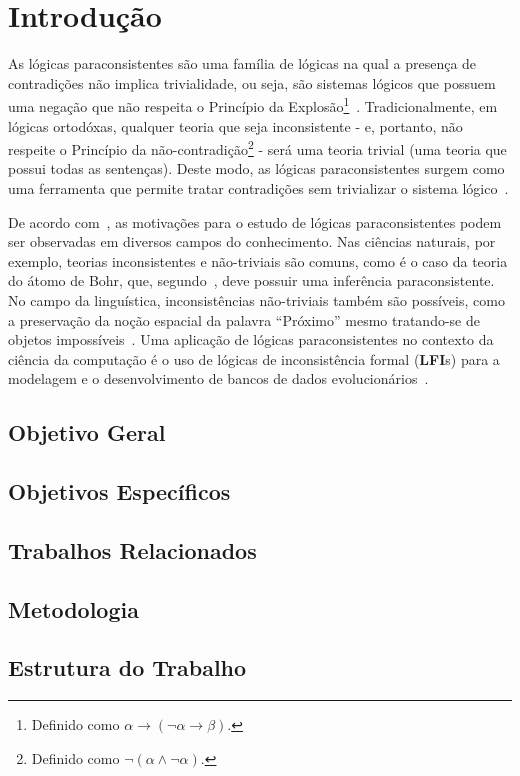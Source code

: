 \chapter{Introdução} 
\label{cap:Introducao}
As lógicas paraconsistentes são uma família de lógicas na qual a presença de contradições não implica trivialidade, ou seja, são sistemas lógicos que possuem uma negação que não respeita o Princípio da Explosão\footnote{Definido como $\alpha \rightarrow (\neg \alpha \rightarrow \beta)$.}~\cite{carnielli2007}. Tradicionalmente, em lógicas ortodóxas, qualquer teoria que seja inconsistente {-} e, portanto, não respeite o Princípio da não-contradição\footnote{Definido como $\neg (\alpha \land \neg \alpha)$.} {-} será uma teoria trivial (uma teoria que possui todas as sentenças). Deste modo, as lógicas paraconsistentes surgem como uma ferramenta que permite tratar contradições sem trivializar o sistema lógico~\cite{Carnielli_Coniglio_2016}.

De acordo com~\cite{sep-logic-paraconsistent}, as motivações para o estudo de lógicas paraconsistentes podem ser observadas em diversos campos do conhecimento. Nas ciências naturais, por exemplo, teorias inconsistentes e não-triviais são comuns, como é o caso da teoria do átomo de Bohr, que, segundo~\cite{Brown2015-BROCAP-9}, deve possuir uma inferência paraconsistente. No campo da linguística, inconsistências não-triviais também são possíveis, como a preservação da noção espacial da palavra ``Próximo'' mesmo tratando-se de objetos impossíveis~\cite{McGinnis2013-MCGTUA}. Uma aplicação de lógicas paraconsistentes no contexto da ciência da computação é o uso de lógicas de inconsistência formal (\textbf{LFI}s) para a modelagem e o desenvolvimento de bancos de dados evolucionários~\cite{carnielli2000formal}.



    \section{Objetivo Geral}


    \section{Objetivos Específicos}



    \section{Trabalhos Relacionados}


    \section{Metodologia}
        

    \section{Estrutura do Trabalho}
       